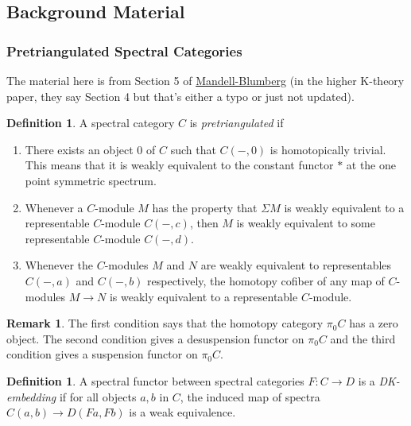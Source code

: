 \documentclass[letterpaper]{article}
\theoremstyle{definition}
\newtheorem{definition}[lemma]{Definition}
\newtheorem{remark}[lemma]{Remark}
\begin{document}
\subsection{Background Material}

\subsubsection{Pretriangulated Spectral Categories}

The material here is from Section 5 of \href{References/LocalizationTHH.pdf}{Mandell-Blumberg} (in the higher K-theory paper, they say Section 4 but that's either a typo or just not updated). 

\begin{definition}
A spectral category $C$ is \textit{pretriangulated} if 
\begin{enumerate}
\item There exists an object 0 of $C$ such that $C(-,0)$ is homotopically trivial. This means that it is weakly equivalent to the constant functor $*$ at the one point symmetric spectrum. 
\item Whenever a $C$-module $M$ has the property that $\Sigma M$ is weakly equivalent to a representable $C$-module $C(-,c)$, then $M$ is weakly equivalent to some representable $C$-module $C(-,d)$.
\item Whenever the $C$-modules $M$ and $N$ are weakly equivalent to representables $C(-,a)$ and $C(-,b)$ respectively, the homotopy cofiber of any map of $C$-modules $M \rightarrow N$ is weakly equivalent to a representable $C$-module.
\end{enumerate}
\end{definition}

\begin{remark}
The first condition says that the homotopy category $\pi_0 C$ has a zero object. The second condition gives a desuspension functor on $\pi_0 C$ and the third condition gives a suspension functor on $\pi_0 C$. 
\end{remark}

\begin{definition}
A spectral functor between spectral categories $F : C \rightarrow D$ is a \textit{DK-embedding} if for all objects $a,b$ in $C$, the induced map of spectra
$C(a,b) \rightarrow D(Fa,Fb)$ is a weak equivalence. 
\end{definition}
\end{document}
